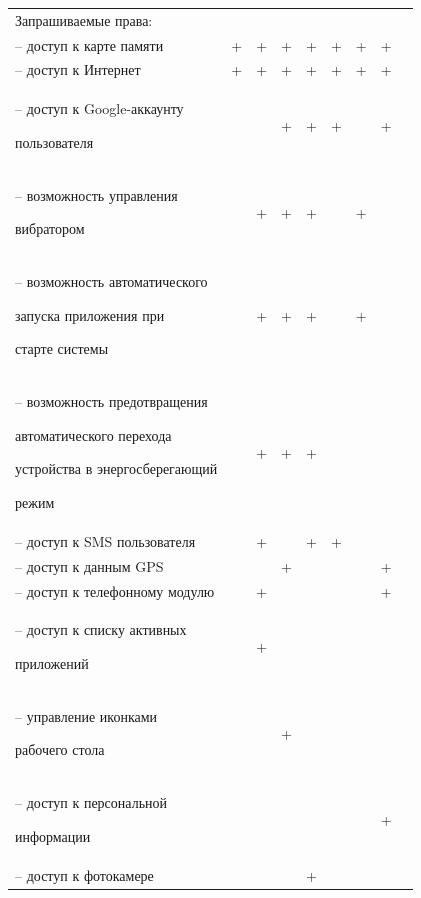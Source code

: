 \begin{table} [h!]
{\begin{tabular}{| m{6.6cm} | c | c | c | c | c | c | c | c |}
      Запрашиваемые права:
      & & & & & & & & \\

      -- доступ к карте памяти
      & +
      & +
      & +
      & +
      & +
      & +
      & +
      & \\

      -- доступ к Интернет
      & +
      & +
      & +
      & +
      & +
      & +
      & +
      & \\

      -- доступ к Google-аккаунту \par пользователя
      &
      &
      & +
      & +
      & +
      &
      & +
      & \\

      -- возможность управления \par вибратором
      &
      & +
      & +
      & +
      &
      & +
      &
      & \\

      -- возможность автоматического \par запуска приложения при \par старте системы
      &
      & +
      & +
      & +
      &
      & +
      &
      & \\

      -- возможность предотвращения \par
      автоматического перехода \par
      устройства в энергосберегающий \par
      режим
      &
      & +
      & +
      & +
      &
      &
      &
      & \\

      -- доступ к SMS пользователя
      &
      & +
      &
      & +
      & +
      &
      &
      & \\

      -- доступ к данным GPS
      &
      &
      & +
      &
      &
      &
      & +
      & \\

      -- доступ к телефонному модулю
      &
      & +
      &
      &
      &
      &
      & +
      & \\

      -- доступ к списку активных \par приложений
      &
      & +
      &
      &
      &
      &
      &
      & \\

      -- управление иконками \par рабочего стола
      &
      &
      & +
      &
      &
      &
      &
      & \\

      -- доступ к персональной \par информации
      &
      &
      &
      &
      &
      &
      & +
      & \\

      -- доступ к фотокамере
      &
      &
      &
      & +
      &
      &
      &
      & \\
      \hline
    \end{tabular}
  }
\end{table}
